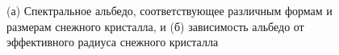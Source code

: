 \documentclass[a4paper, fontsize=14pt]{scrartcl}
\begin{document}
\begin{figure}[h]
    \begin{minipage}[h]{0.5\linewidth}
    \end{minipage}
    \hfill
    \begin{minipage}[h]{0.5\linewidth}
    \end{minipage}
    \caption{(а) Спектральное альбедо, соответствующее различным формам и размерам снежного кристалла, и (б) зависимость альбедо от эффективного радиуса снежного кристалла}
    \label{fig:image}
\end{figure}
\end{document}
